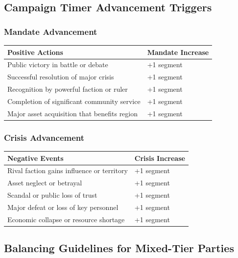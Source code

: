 \documentclass[11pt,letterpaper]{article}
\begin{document}
\subsection{Campaign Timer Advancement Triggers}

\subsubsection{Mandate Advancement}

\begin{longtable}{|>{\raggedright\arraybackslash}p{6cm}|>{\raggedright\arraybackslash}p{6cm}|}
\hline
\textbf{Positive Actions} & \textbf{Mandate Increase} \\
\hline
Public victory in battle or debate & +1 segment \\
Successful resolution of major crisis & +1 segment \\
Recognition by powerful faction or ruler & +1 segment \\
Completion of significant community service & +1 segment \\
Major asset acquisition that benefits region & +1 segment \\
\hline
\end{longtable}

\subsubsection{Crisis Advancement}

\begin{longtable}{|>{\raggedright\arraybackslash}p{6cm}|>{\raggedright\arraybackslash}p{6cm}|}
\hline
\textbf{Negative Events} & \textbf{Crisis Increase} \\
\hline
Rival faction gains influence or territory & +1 segment \\
Asset neglect or betrayal & +1 segment \\
Scandal or public loss of trust & +1 segment \\
Major defeat or loss of key personnel & +1 segment \\
Economic collapse or resource shortage & +1 segment \\
\hline
\end{longtable}

\subsection{Balancing Guidelines for Mixed-Tier Parties}
\end{document}
